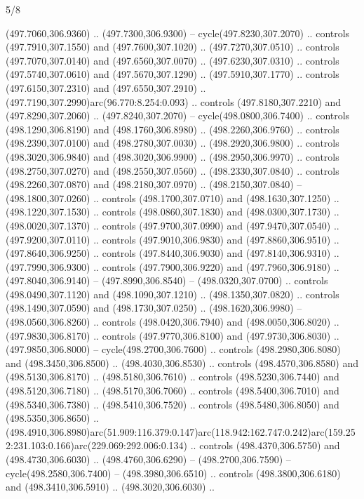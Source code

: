 \begin{flagdescription}{5/8}
\begin{scope}[xshift=0.5\flaglength,yshift=0.5\flagwidth,scale=\flagwidth/475.63]
\begin{scope}[y=0.8pt, x=0.8pt, yscale=-1, xscale=1,shift={(-450,-300)}]
\begin{scope}[cm={{1.0,0.0,0.0,1.0,(-0.0002,0.12556)}},cm={{1.0,0.0,0.0,1.0,(0.00179,0.0)}}]
\begin{scope}[cm={{1.11592,0.0,0.0,1.11592,(-106.89933,-41.77764)}}]
\begin{scope}[draw=black,fill=cfff]
\begin{scope}[fill=black]
  (497.7060,306.9360) .. (497.7300,306.9300) -- cycle(497.8230,307.2070) ..
  controls (497.7910,307.1550) and (497.7600,307.1020) .. (497.7270,307.0510) ..
  controls (497.7070,307.0140) and (497.6560,307.0070) .. (497.6230,307.0310) ..
  controls (497.5740,307.0610) and (497.5670,307.1290) .. (497.5910,307.1770) ..
  controls (497.6150,307.2310) and (497.6550,307.2910) ..
  (497.7190,307.2990)arc(96.770:8.254:0.093) .. controls (497.8180,307.2210) and
  (497.8290,307.2060) .. (497.8240,307.2070) -- cycle(498.0800,306.7400) ..
  controls (498.1290,306.8190) and (498.1760,306.8980) .. (498.2260,306.9760) ..
  controls (498.2390,307.0100) and (498.2780,307.0030) .. (498.2920,306.9800) ..
  controls (498.3020,306.9840) and (498.3020,306.9900) .. (498.2950,306.9970) ..
  controls (498.2750,307.0270) and (498.2550,307.0560) .. (498.2330,307.0840) ..
  controls (498.2260,307.0870) and (498.2180,307.0970) .. (498.2150,307.0840) --
  (498.1800,307.0260) .. controls (498.1700,307.0710) and (498.1630,307.1250) ..
  (498.1220,307.1530) .. controls (498.0860,307.1830) and (498.0300,307.1730) ..
  (498.0020,307.1370) .. controls (497.9700,307.0990) and (497.9470,307.0540) ..
  (497.9200,307.0110) .. controls (497.9010,306.9830) and (497.8860,306.9510) ..
  (497.8640,306.9250) .. controls (497.8440,306.9030) and (497.8140,306.9310) ..
  (497.7990,306.9300) .. controls (497.7900,306.9220) and (497.7960,306.9180) ..
  (497.8040,306.9140) -- (497.8990,306.8540) -- (498.0320,307.0700) .. controls
  (498.0490,307.1120) and (498.1090,307.1210) .. (498.1350,307.0820) .. controls
  (498.1490,307.0590) and (498.1730,307.0250) .. (498.1620,306.9980) --
  (498.0560,306.8260) .. controls (498.0420,306.7940) and (498.0050,306.8020) ..
  (497.9830,306.8170) .. controls (497.9770,306.8100) and (497.9730,306.8030) ..
  (497.9850,306.8000) -- cycle(498.2700,306.7600) .. controls
  (498.2980,306.8080) and (498.3450,306.8500) .. (498.4030,306.8530) .. controls
  (498.4570,306.8580) and (498.5130,306.8170) .. (498.5180,306.7610) .. controls
  (498.5230,306.7440) and (498.5120,306.7180) .. (498.5170,306.7060) .. controls
  (498.5400,306.7010) and (498.5340,306.7380) .. (498.5410,306.7520) .. controls
  (498.5480,306.8050) and (498.5350,306.8650) ..
  (498.4910,306.8980)arc(51.909:116.379:0.147)arc(118.942:162.747:0.242)arc(159.252:231.103:0.166)arc(229.069:292.006:0.134)
  .. controls (498.4370,306.5750) and (498.4730,306.6030) .. (498.4760,306.6290)
  -- (498.2700,306.7590) -- cycle(498.2580,306.7400) -- (498.3980,306.6510) ..
  controls (498.3800,306.6180) and (498.3410,306.5910) .. (498.3020,306.6030) ..

\end{scope}
\end{scope}
\end{scope}
\end{scope}
\end{scope}
\end{scope}
\end{flagdescription}
